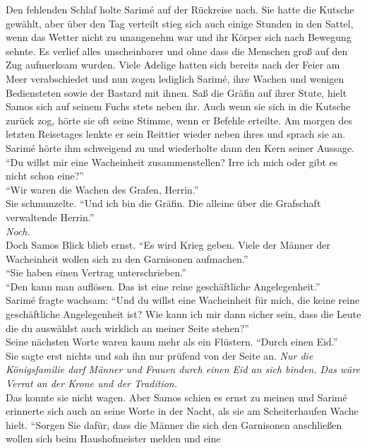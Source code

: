Den fehlenden Schlaf holte Sarimé auf der Rückreise nach. Sie hatte die Kutsche gewählt, aber über 
den Tag verteilt stieg sich auch einige Stunden in den Sattel, wenn das Wetter nicht zu unangenehm 
war und ihr Körper sich nach Bewegung sehnte. Es verlief alles unscheinbarer und ohne dass die 
Menschen groß auf den Zug aufmerksam wurden. Viele Adelige hatten sich bereits nach der Feier am 
Meer verabschiedet und nun zogen lediglich Sarimé, ihre Wachen und wenigen Bediensteten sowie der 
Bastard mit ihnen. Saß die Gräfin auf ihrer Stute, hielt Samos sich auf seinem Fuchs stets neben 
ihr. Auch wenn sie sich in die Kutsche zurück zog, hörte sie oft seine Stimme, wenn er Befehle 
erteilte. Am morgen des letzten Reisetages lenkte er sein Reittier wieder neben ihres und sprach sie 
an. Sarimé hörte ihm schweigend zu und wiederholte dann den Kern seiner Aussage. \\
``Du willst mir eine Wacheinheit zusammenstellen? Irre ich mich oder gibt es nicht schon eine?''\\
``Wir waren die Wachen des Grafen, Herrin.''\\
Sie schmunzelte. ``Und ich bin die Gräfin. Die alleine über die Grafschaft verwaltende Herrin.''\\
\textit{Noch.}\\
Doch Samos Blick blieb ernst. ``Es wird Krieg geben. Viele der Männer der Wacheinheit wollen sich 
zu den Garnisonen aufmachen.''\\
``Sie haben einen Vertrag unterschrieben.''\\
``Den kann man auflösen. Das ist eine reine geschäftliche Angelegenheit.''\\
Sarimé fragte wachsam: ``Und du willst eine Wacheinheit für mich, die keine reine geschäftliche 
Angelegenheit ist? Wie kann ich mir dann sicher sein, dass die Leute die du auswählst auch 
wirklich an meiner Seite stehen?''\\
Seine nächsten Worte waren kaum mehr als ein Flüstern. ``Durch einen Eid.''\\
Sie sagte erst nichts und sah ihn nur prüfend von der Seite an. \textit{Nur die Königsfamilie darf 
Männer und Frauen durch einen Eid an sich binden. Das wäre Verrat an der Krone und der Tradition.}\\
Das konnte sie nicht wagen. Aber Samos schien es ernst zu meinen und Sarimé erinnerte sich auch an 
seine Worte in der Nacht, als sie am Scheiterhaufen Wache hielt. ``Sorgen Sie dafür, dass die 
Männer die sich den Garnisonen anschließen wollen sich beim Haushofmeister melden und eine 
